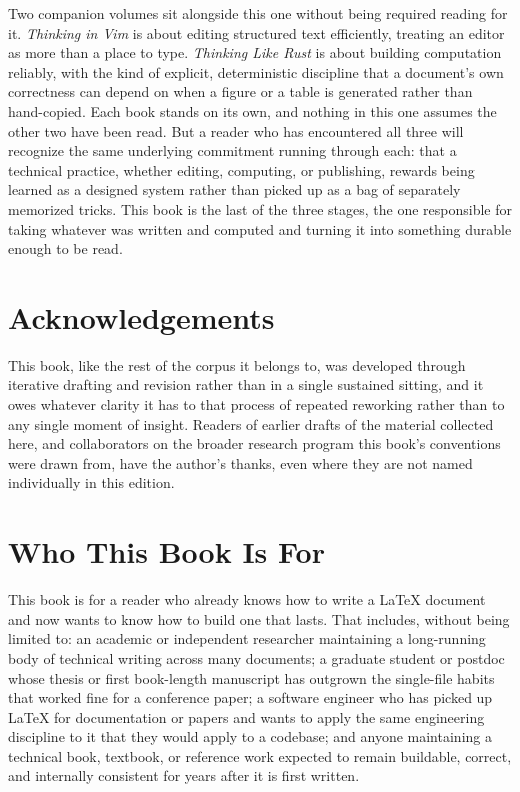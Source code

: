 Two companion volumes sit alongside this one without being required reading for it. \emph{Thinking in Vim} is about editing structured text efficiently, treating an editor as more than a place to type. \emph{Thinking Like Rust} is about building computation reliably, with the kind of explicit, deterministic discipline that a document's own correctness can depend on when a figure or a table is generated rather than hand-copied. Each book stands on its own, and nothing in this one assumes the other two have been read. But a reader who has encountered all three will recognize the same underlying commitment running through each: that a technical practice, whether editing, computing, or publishing, rewards being learned as a designed system rather than picked up as a bag of separately memorized tricks. This book is the last of the three stages, the one responsible for taking whatever was written and computed and turning it into something durable enough to be read.

\chapter*{Acknowledgements}

This book, like the rest of the corpus it belongs to, was developed through iterative drafting and revision rather than in a single sustained sitting, and it owes whatever clarity it has to that process of repeated reworking rather than to any single moment of insight. Readers of earlier drafts of the material collected here, and collaborators on the broader research program this book's conventions were drawn from, have the author's thanks, even where they are not named individually in this edition.

\chapter*{Who This Book Is For}

This book is for a reader who already knows how to write a LaTeX document and now wants to know how to build one that lasts. That includes, without being limited to: an academic or independent researcher maintaining a long-running body of technical writing across many documents; a graduate student or postdoc whose thesis or first book-length manuscript has outgrown the single-file habits that worked fine for a conference paper; a software engineer who has picked up LaTeX for documentation or papers and wants to apply the same engineering discipline to it that they would apply to a codebase; and anyone maintaining a technical book, textbook, or reference work expected to remain buildable, correct, and internally consistent for years after it is first written.

